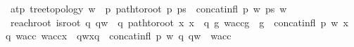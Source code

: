\begin{isabellebody}
\ \ at{\isacharunderscore}{\kern0pt}p{\isacharcolon}{\kern0pt}\ {\isachardoublequoteopen}{\isasymlbrakk}tree{\isacharunderscore}{\kern0pt}topology{\isacharsemicolon}{\kern0pt}\ w\ {\isasymin}\ {\isasymL}\isactrlsup {\isacharasterisk}{\kern0pt}{\isacharparenleft}{\kern0pt}p{\isacharparenright}{\kern0pt}{\isacharsemicolon}{\kern0pt}\ path{\isacharunderscore}{\kern0pt}to{\isacharunderscore}{\kern0pt}root\ p\ ps{\isasymrbrakk}\ {\isasymLongrightarrow}\ concat{\isacharunderscore}{\kern0pt}infl\ p\ w\ ps\ w{\isachardoublequoteclose}\ {\isacharbar}{\kern0pt}\ \isanewline
\ \ reach{\isacharunderscore}{\kern0pt}root{\isacharcolon}{\kern0pt}\ {\isachardoublequoteopen}{\isasymlbrakk}is{\isacharunderscore}{\kern0pt}root\ q{\isacharsemicolon}{\kern0pt}\ qw\ {\isasymin}\ {\isasymL}\isactrlsup {\isacharasterisk}{\kern0pt}{\isacharparenleft}{\kern0pt}q{\isacharparenright}{\kern0pt}{\isacharsemicolon}{\kern0pt}\ path{\isacharunderscore}{\kern0pt}to{\isacharunderscore}{\kern0pt}root\ x\ {\isacharparenleft}{\kern0pt}x\ {\isacharhash}{\kern0pt}\ {\isacharbrackleft}{\kern0pt}q{\isacharbrackright}{\kern0pt}{\isacharparenright}{\kern0pt}{\isacharsemicolon}{\kern0pt}\ {\isacharparenleft}{\kern0pt}{\isasymforall}g{\isachardot}{\kern0pt}\ w{\isacharunderscore}{\kern0pt}acc{\isasymdown}\isactrlsub g\ {\isasymin}\ {\isasymL}\isactrlsup {\isacharasterisk}{\kern0pt}{\isacharparenleft}{\kern0pt}g{\isacharparenright}{\kern0pt}{\isacharparenright}{\kern0pt}{\isacharsemicolon}{\kern0pt}\ \ concat{\isacharunderscore}{\kern0pt}infl\ p\ w\ {\isacharparenleft}{\kern0pt}x\ {\isacharhash}{\kern0pt}\ {\isacharbrackleft}{\kern0pt}q{\isacharbrackright}{\kern0pt}{\isacharparenright}{\kern0pt}\ w{\isacharunderscore}{\kern0pt}acc{\isacharsemicolon}{\kern0pt}\ {\isacharparenleft}{\kern0pt}{\isacharparenleft}{\kern0pt}{\isacharparenleft}{\kern0pt}w{\isacharunderscore}{\kern0pt}acc{\isasymdown}\isactrlsub x{\isacharparenright}{\kern0pt}{\isasymdown}\isactrlsub {\isacharquery}{\kern0pt}{\isacharparenright}{\kern0pt}{\isasymdown}\isactrlsub {\isacharbang}{\kern0pt}\isactrlsub {\isacharquery}{\kern0pt}{\isacharparenright}{\kern0pt}\ {\isacharequal}{\kern0pt}\ {\isacharparenleft}{\kern0pt}{\isacharparenleft}{\kern0pt}{\isacharparenleft}{\kern0pt}qw{\isasymdown}\isactrlsub {\isacharbraceleft}{\kern0pt}\isactrlsub x\isactrlsub {\isacharcomma}{\kern0pt}\isactrlsub q\isactrlsub {\isacharbraceright}{\kern0pt}{\isacharparenright}{\kern0pt}{\isasymdown}\isactrlsub {\isacharbang}{\kern0pt}{\isacharparenright}{\kern0pt}{\isasymdown}\isactrlsub {\isacharbang}{\kern0pt}\isactrlsub {\isacharquery}{\kern0pt}{\isacharparenright}{\kern0pt}{\isasymrbrakk}\ {\isasymLongrightarrow}\ concat{\isacharunderscore}{\kern0pt}infl\ p\ w\ {\isacharbrackleft}{\kern0pt}q{\isacharbrackright}{\kern0pt}\ {\isacharparenleft}{\kern0pt}qw\ {\isasymsqdot}\ w{\isacharunderscore}{\kern0pt}acc{\isacharparenright}{\kern0pt}{\isachardoublequoteclose}\ {\isacharbar}{\kern0pt}\ \isanewline

\end{isabellebody}

